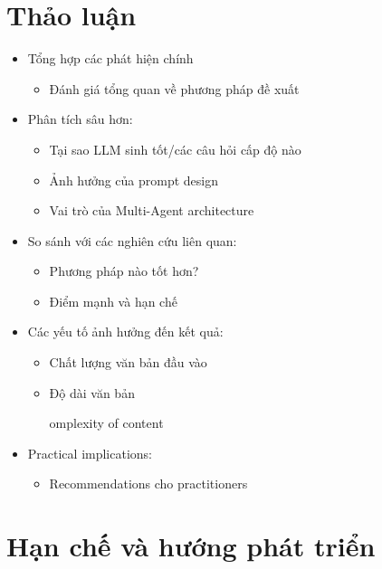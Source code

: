 \section{Thảo luận}
\begin{itemize}
    \item Tổng hợp các phát hiện chính
    \begin{itemize}
        \item Đánh giá tổng quan về phương pháp đề xuất
    \end{itemize}
    \item Phân tích sâu hơn:
    \begin{itemize}
        \item Tại sao LLM sinh tốt/các câu hỏi cấp độ nào
        \item Ảnh hưởng của prompt design
        \item Vai trò của Multi-Agent architecture
    \end{itemize}
    \item So sánh với các nghiên cứu liên quan:
    \begin{itemize}
        \item Phương pháp nào tốt hơn?
        \item Điểm mạnh và hạn chế
    \end{itemize}
    \item Các yếu tố ảnh hưởng đến kết quả:
    \begin{itemize}
        \item Chất lượng văn bản đầu vào
        \item Độ dài văn bản
        \subject Complexity of content
    \end{itemize}
    \item Practical implications:
    \begin{itemize}
        \item Recommendations cho practitioners
    \end{itemize}
\end{itemize}

\section{Hạn chế và hướng phát triển}

